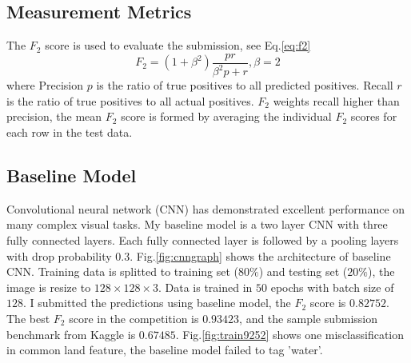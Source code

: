 \documentclass[11pt,oneside,a4paper]{article}
\begin{document}
\begin{multicols}{2}
\subsection{Measurement Metrics}
The $F_2$ score is used to evaluate the submission, see Eq.\ref{eq:f2}
\begin{equation}
F_{2} = (1+\beta^{2})\frac{pr}{\beta^2 p + r}, \beta = 2 \label{eq:f2}
\end{equation}
where Precision $p$ is the ratio of true positives to all predicted positives. Recall $r$ is the ratio of true positives to all actual positives. $F_2$ weights recall higher than precision, the mean $F_2$ score is formed by averaging the individual $F_2$ scores for each row in the test data. 

\subsection{Baseline Model}
Convolutional neural network (CNN) has demonstrated excellent performance on many complex visual tasks. My baseline model is a two layer CNN with three fully connected  layers. Each fully connected layer is followed by a pooling layers with drop probability $0.3$. Fig.\ref{fig:cnngraph} shows the architecture of baseline CNN. Training data is splitted to training set ($80\%$) and testing set ($20\%$), the image is resize to $128\times 128\times 3$. Data is trained in $50$ epochs with batch size of $128$. I submitted the predictions using baseline model, the $F_2$ score is $0.82752$. The best $F_2$ score in the competition is $0.93423$, and the sample submission benchmark from Kaggle is $0.67485$. Fig.\ref{fig:train9252} shows one misclassification in common land feature, the baseline model failed to tag 'water'.


\end{multicols}
\end{document}
